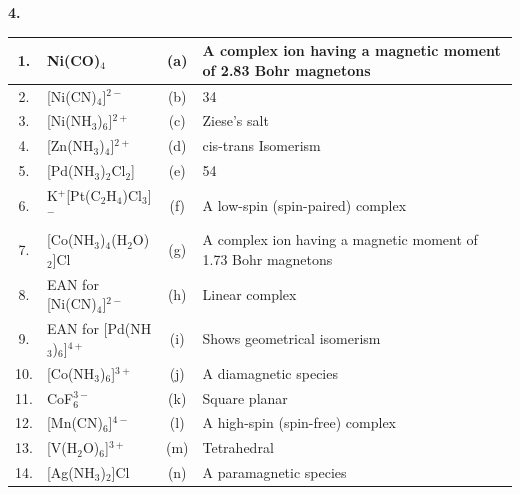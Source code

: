 \documentclass[10pt]{extarticle}
\newcommand{\qn}[1]{\par\smallskip\noindent\textbf{#1.}~}
\begin{document}
\noindent\begin{minipage}{\textwidth}\qn{4}\par\vspace{-3pt}
\begin{center}\small
\begin{tabular}{|c|l|c|p{6.2cm}|}
\hline
1. & Ni(CO)$_4$ & (a) & A complex ion having a magnetic moment of 2.83 Bohr magnetons \\\hline
2. & [Ni(CN)$_4$]$^{2-}$ & (b) & 34 \\\hline
3. & [Ni(NH$_3$)$_6$]$^{2+}$ & (c) & Ziese's salt \\\hline
4. & [Zn(NH$_3$)$_4$]$^{2+}$ & (d) & cis-trans Isomerism \\\hline
5. & [Pd(NH$_3$)$_2$Cl$_2$] & (e) & 54 \\\hline
6. & K$^+$[Pt(C$_2$H$_4$)Cl$_3$]$^-$ & (f) & A low-spin (spin-paired) complex \\\hline
7. & [Co(NH$_3$)$_4$(H$_2$O)$_2$]Cl & (g) & A complex ion having a magnetic moment of 1.73 Bohr magnetons \\\hline
8. & EAN for [Ni(CN)$_4$]$^{2-}$ & (h) & Linear complex \\\hline
9. & EAN for [Pd(NH$_3$)$_6$]$^{4+}$ & (i) & Shows geometrical isomerism \\\hline
10. & [Co(NH$_3$)$_6$]$^{3+}$ & (j) & A diamagnetic species \\\hline
11. & CoF$_6^{3-}$ & (k) & Square planar \\\hline
12. & [Mn(CN)$_6$]$^{4-}$ & (l) & A high-spin (spin-free) complex \\\hline
13. & [V(H$_2$O)$_6$]$^{3+}$ & (m) & Tetrahedral \\\hline
14. & [Ag(NH$_3$)$_2$]Cl & (n) & A paramagnetic species \\\hline
\end{tabular}
\end{center}\end{minipage}
\end{document}
